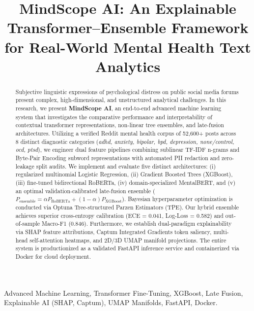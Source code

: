 \documentclass[conference]{IEEEtran}
\begin{document}
\title{MindScope AI: An Explainable Transformer--Ensemble Framework for Real-World Mental Health Text Analytics}

\author{
}

\maketitle

\begin{abstract}
Subjective linguistic expressions of psychological distress on public social media forums present complex, high-dimensional, and unstructured analytical challenges. In this research, we present \textbf{MindScope AI}, an end-to-end advanced machine learning system that investigates the comparative performance and interpretability of contextual transformer representations, non-linear tree ensembles, and late-fusion architectures. Utilizing a verified Reddit mental health corpus of 52,600+ posts across 8 distinct diagnostic categories (\textit{adhd, anxiety, bipolar, bpd, depression, none/control, ocd, ptsd}), we engineer dual feature pipelines combining sublinear TF-IDF n-grams and Byte-Pair Encoding subword representations with automated PII redaction and zero-leakage split audits. We implement and evaluate five distinct architectures: (i) regularized multinomial Logistic Regression, (ii) Gradient Boosted Trees (XGBoost), (iii) fine-tuned bidirectional RoBERTa, (iv) domain-specialized MentalBERT, and (v) an optimal validation-calibrated late-fusion ensemble ($P_{\text{ensemble}} = \alpha P_{\text{RoBERTa}} + (1-\alpha)P_{\text{XGBoost}}$). Bayesian hyperparameter optimization is conducted via Optuna Tree-structured Parzen Estimators (TPE). Our hybrid ensemble achieves superior cross-entropy calibration (ECE = 0.041, Log-Loss = 0.582) and out-of-sample Macro-F1 (0.846). Furthermore, we establish dual-paradigm explainability via SHAP feature attributions, Captum Integrated Gradients token saliency, multi-head self-attention heatmaps, and 2D/3D UMAP manifold projections. The entire system is productionized as a validated FastAPI inference service and containerized via Docker for cloud deployment.
\end{abstract}

\begin{IEEEkeywords}
Advanced Machine Learning, Transformer Fine-Tuning, XGBoost, Late Fusion, Explainable AI (SHAP, Captum), UMAP Manifolds, FastAPI, Docker.
\end{IEEEkeywords}
\end{document}
